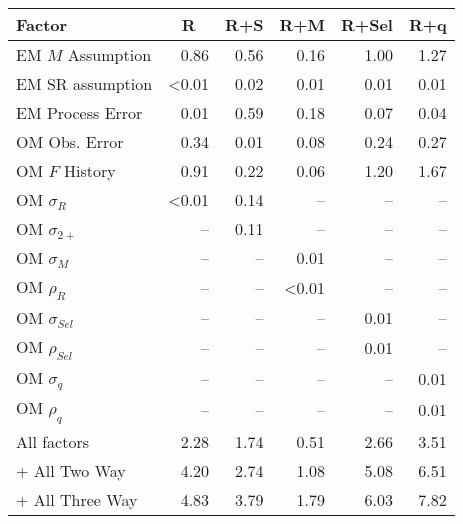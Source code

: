 \begin{center}
\begin{tabular}{lrrrrr}
\hline\hline
\multicolumn{1}{l}{Factor}&\multicolumn{1}{c}{R}&\multicolumn{1}{c}{R+S}&\multicolumn{1}{c}{R+M}&\multicolumn{1}{c}{R+Sel}&\multicolumn{1}{c}{R+q}\tabularnewline
\hline
EM $M$ Assumption&0.86&0.56&0.16&1.00&1.27\tabularnewline
EM SR assumption&\textless  0.01&0.02&0.01&0.01&0.01\tabularnewline
EM Process Error&0.01&0.59&0.18&0.07&0.04\tabularnewline
OM Obs. Error&0.34&0.01&0.08&0.24&0.27\tabularnewline
OM $F$ History&0.91&0.22&0.06&1.20&1.67\tabularnewline
OM $\sigma_R$&\textless  0.01&0.14&--&--&--\tabularnewline
OM $\sigma_{2+}$ &--&0.11&--&--&--\tabularnewline
OM $\sigma_M$&--&--&0.01&--&--\tabularnewline
OM $\rho_R$&--&--&\textless  0.01&--&--\tabularnewline
OM $\sigma_{Sel}$&--&--&--&0.01&--\tabularnewline
OM $\rho_{Sel}$&--&--&--&0.01&--\tabularnewline
OM $\sigma_q$&--&--&--&--&0.01\tabularnewline
OM $\rho_q$&--&--&--&--&0.01\tabularnewline
All factors&2.28&1.74&0.51&2.66&3.51\tabularnewline
+ All Two Way&4.20&2.74&1.08&5.08&6.51\tabularnewline
+ All Three Way&4.83&3.79&1.79&6.03&7.82\tabularnewline
\hline
\end{tabular}\end{center}
